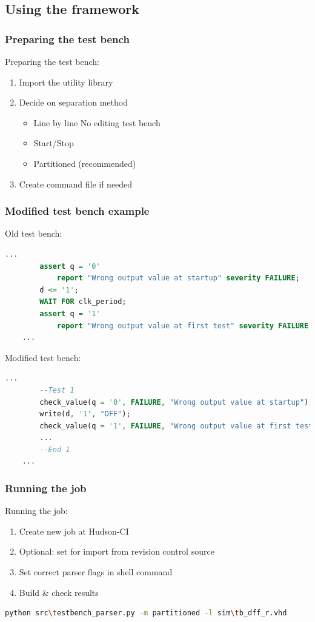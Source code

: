 \documentclass[british,10pt]{beamer}
\begin{document}
\subsection{Using the framework}

\begin{frame}\frametitle{Preparing the test bench}
Preparing the test bench:
\begin{enumerate}
\item Import the utility library
\item Decide on separation method
\begin{itemize}
\item Line by line  No editing test bench
\item Start/Stop
\item Partitioned (recommended)
\end{itemize}
\item Create command file if needed
\end{enumerate}
\end{frame}


\begin{frame}[fragile]\frametitle{Modified test bench example}
Old test bench:
\begin{lstlisting}[language=VHDL, tabsize=4, frame=single, framesep=2mm, belowskip=8pt, aboveskip=8pt, showstringspaces=false, basicstyle=\scriptsize]
	...
		assert q = '0'
			report "Wrong output value at startup" severity FAILURE;
		d <= '1';
     	WAIT FOR clk_period;
     	assert q = '1'
			report "Wrong output value at first test" severity FAILURE;
	...
\end{lstlisting}
\vskip1pt
Modified test bench:
\begin{lstlisting}[language=VHDL, tabsize=4, frame=single, framesep=2mm, belowskip=8pt, aboveskip=8pt, showstringspaces=false, basicstyle=\scriptsize]
	...
		--Test 1
		check_value(q = '0', FAILURE, "Wrong output value at startup");
		write(d, '1', "DFF");
		check_value(q = '1', FAILURE, "Wrong output value at first test");
		...
		--End 1
	...
\end{lstlisting}
\end{frame}


\begin{frame}[fragile]\frametitle{Running the job}
Running the job:
\begin{enumerate}
\item Create new job at Hudson-CI 
\item Optional: set for import from revision control source
\item Set correct parser flags in shell command
\item Build \& check results
\end{enumerate}
\vskip5pt
\begin{lstlisting}[language=bash, tabsize=4, frame=single, framesep=2mm, belowskip=8pt, aboveskip=8pt, showstringspaces=false, basicstyle=\scriptsize]
python src\testbench_parser.py -m partitioned -l sim\tb_dff_r.vhd
\end{lstlisting}
\end{frame}
\end{document}
